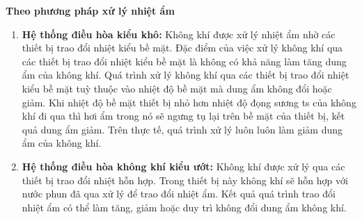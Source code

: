 	\textbf{Theo phương pháp xử lý nhiệt ẩm}
	\begin{enumerate}[leftmargin=0.5cm]
		\setlength\itemsep{1mm}
		\item \textbf{Hệ thống điều hòa kiểu khô:} Không khí được xử lý nhiệt ẩm nhờ các thiết bị trao đổi nhiệt kiểu bề mặt. Đặc điểm của việc xử lý không khí qua các thiết bị trao đổi nhiệt kiểu bề mặt là không có khả năng làm tăng dung ẩm của không khí. Quá trình xử lý không khí qua các thiết bị trao đổi nhiệt kiểu bề mặt tuỳ thuộc vào nhiệt độ bề mặt mà dung ẩm không đổi hoặc giảm. Khi nhiệt độ bề mặt thiết bị nhỏ hơn nhiệt độ đọng sương ts của không khí đi qua thì hơi ẩm trong nó sẽ ngưng tụ lại trên bề mặt của thiết bị, kết quả dung ẩm giảm. Trên thực tế, quá trình xử lý luôn luôn làm giảm dung ẩm của không khí.
		\item \textbf{Hệ thống điều hòa không khí kiểu ướt:} Không khí được xử lý qua các thiết bị trao đổi nhiệt hỗn hợp. Trong thiết bị này không khí sẽ hỗn hợp với nước phun đã qua xử lý để trao đổi nhiệt ẩm. Kết quả quá trình trao đổi nhiệt ẩm có thể làm tăng, giảm hoặc duy trì không đổi dung ẩm không khí.
	\end{enumerate}
	
